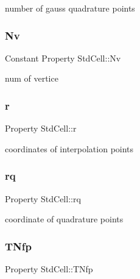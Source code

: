 number of gauss quadrature points 

\mbox{\label{class_std_cell_aa9184c7d3310ebc082f914a8358e786c}} 
\subsubsection{\texorpdfstring{Nv}{Nv}}
{\footnotesize\ttfamily Constant Property Std\+Cell\+::\+Nv}



num of vertice 

\mbox{\label{class_std_cell_a737dd2feb25f74be0215a594334ec622}} 
\subsubsection{\texorpdfstring{r}{r}}
{\footnotesize\ttfamily Property Std\+Cell\+::r\hspace{0.3cm}{\ttfamily [protected]}}



coordinates of interpolation points 

\mbox{\label{class_std_cell_a5eaee3fe41eea014df903849502ed0b3}} 
\subsubsection{\texorpdfstring{rq}{rq}}
{\footnotesize\ttfamily Property Std\+Cell\+::rq\hspace{0.3cm}{\ttfamily [protected]}}



coordinate of quadrature points 

\mbox{\label{class_std_cell_a6a0f137c9f2cbdb072f971ddc539648a}} 
\subsubsection{\texorpdfstring{T\+Nfp}{TNfp}}
{\footnotesize\ttfamily Property Std\+Cell\+::\+T\+Nfp\hspace{0.3cm}{\ttfamily [protected]}}



